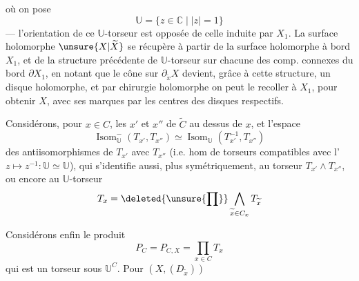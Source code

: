 où on pose
\[
\mathbb{U}=\{z\in\mathbb{C}\mid |z|=1\}
\]
--- l'orientation de ce $\mathbb{U}$-torseur  est opposée de celle induite par $X_1$.  La surface holomorphe $\unsure{X|\widetilde X}$  se récupère à partir de la surface holomorphe à bord $X_1$, et de la structure précédente de $\mathbb{U}$-torseur sur chacune des comp. connexes  du bord $\partial X_1$, en notant que le cône sur $\partial_{\widetilde x}X$  devient, grâce à cette structure, un disque  holomorphe, et par chirurgie holomorphe on peut le recoller à $X_1$, pour obtenir $X$, avec ses marques par les centres des disques respectifs.

Considérons, pour $x\in C$, les    $x'$ et $x''$ de $\widetilde C$ au dessus de $x$, et l'espace
\[
\operatorname{Isom}_{\mathbb{U}}^{-}(T_{x'},T_{x''})\simeq\operatorname{Isom}_{\mathbb{U}}(T_{x'}^{-1},T_{x''})
\]
des antiisomorphismes de $T_{x'}$ avec $T_{x''}$ (i.e. hom de torseurs compatibles avec l' $z\longmapsto z^{-1}:\mathbb{U}\simeq\mathbb{U}$), qui s'identifie aussi, plus symétriquement, au torseur $T_{x'}\wedge T_{x''}$, ou encore au $\mathbb{U}$-torseur
\[
T_x=\deleted{\unsure{\prod}}\mathop{\bigwedge}_{\widetilde x\in C_x}T_{\widetilde x}
\]

Considérons enfin le produit
\[
P_C=P_{C,X}=\prod_{x\in C}T_x
\]
qui est un torseur sous $\mathbb{U}^C$.  Pour $(X,(D_{\widetilde x}))$

